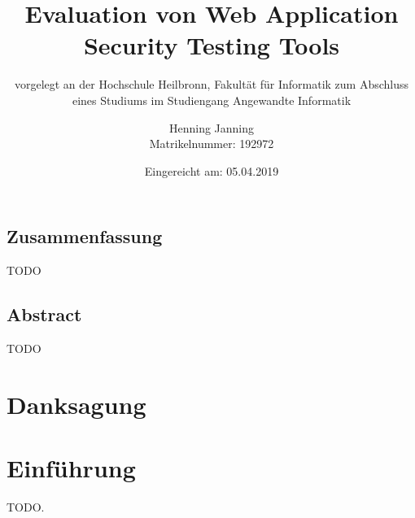 \documentclass[12pt,oneside,a4paper,parskip]{scrbook}
\def\BaAuthor{Henning Janning}
\def\BaTitle{Evaluation von Web Application Security Testing Tools}
\def\BaSupervisorOne{Prof. Andreas Mayer}
\def\BaSupervisorTwo{Susanne Steuer (M.Sc.) }
\def\BaDeadline{05.04.2019}
\def\MatNr{192972}
\begin{document}


\frontmatter
\titlehead{%
  {Hochschule Heilbronn\\
   Fakultät für Informatik}}
\subject{Bachelorarbeit}
\title{\BaTitle\\[15mm]}
\subtitle{\normalsize{vorgelegt an der Hochschule Heilbronn, Fakultät für Informatik zum Abschluss eines Studiums im Studiengang Angewandte Informatik}}
\author{\BaAuthor\\
\normalsize{Matrikelnummer: \MatNr}}
\date{\normalsize{Eingereicht am: \BaDeadline}}
\publishers{
  \normalsize{Erstpr\"{u}fer: \BaSupervisorOne}\\
  \normalsize{Zweitpr\"{u}ferin: \BaSupervisorTwo}\\
}


\maketitle



\section*{Zusammenfassung}

TODO

\section*{Abstract}

TODO

\newpage
\chapter*{Danksagung}



\tableofcontents



\mainmatter

\chapter{Einführung}\label{ch:intro}

TODO. \cite{gamma2011patterns}
\end{document}
